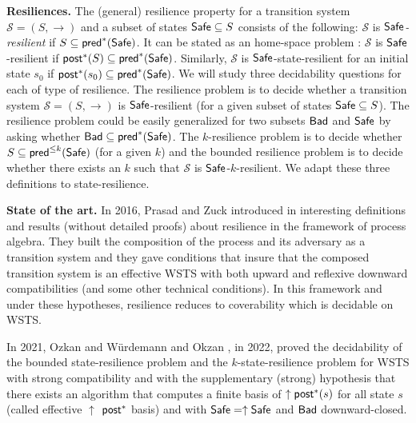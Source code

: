 {\bf Resiliences.}  
The (general) resilience property for a transition system $\mathscr{S} = (S,\rightarrow )$ and a subset of states $\textsf{Safe} \subseteq S$ consists of the following: $\mathscr{S}$ is {\em $\textsf{Safe}$-resilient} if
$S \subseteq \textsf{pred}^*(\textsf{Safe})$. %
It 
can be stated as an home-space problem : $\mathscr{S}$ is $\textsf{Safe}$-resilient if $\textsf{post}^*(S) \subseteq \textsf{pred}^*(\textsf{Safe})$.
Similarly, $\mathscr{S}$ is $\textsf{Safe}$-state-resilient for an initial state $s_0$ if  
$\textsf{post}^*(s_0) \subseteq \textsf{pred}^*(\textsf{Safe})$.
We will study three decidability questions for each of type of resilience.
The resilience problem is to decide whether a transition system $\mathscr{S} = (S,\rightarrow )$ is $\textsf{Safe}$-resilient (for a given subset of states $\textsf{Safe} \subseteq S$).
The resilience problem could be easily generalized for two subsets $\textsf{Bad}$ and $\textsf{Safe}$ by asking
whether $\textsf{Bad} \subseteq \textsf{pred}^*(\textsf{Safe})$.
The $k$-resilience problem is to decide whether $S \subseteq \textsf{pred}^{\leq k}(\textsf{Safe})$ (for a given $k$) and 
the bounded resilience problem is to decide whether there exists an $k$ such that $\mathscr{S}$ is $\textsf{Safe}$-$k$-resilient. We adapt these three definitions to state-resilience.


{\bf State of the art.}
In 2016, Prasad and Zuck introduced in  \cite{DBLP:journals/corr/PrasadZ16} interesting definitions and results (without detailed proofs) about resilience in the framework of process algebra. They built the composition of the process and its adversary as a transition system and they gave conditions that insure that the composed transition system is an effective WSTS with both upward and reflexive downward compatibilities (and some other technical conditions). In this framework and under these hypotheses, resilience reduces to coverability which is decidable on WSTS. 

In 2021, Ozkan and Würdemann  \cite{DBLP:journals/corr/abs-2108-00889} and Okzan \cite{DBLP:conf/gg/Ozkan22}, in 2022, proved the decidability of the bounded state-resilience problem and the $k$-state-resilience problem for WSTS  with strong compatibility and with the supplementary (strong) hypothesis that there exists an algorithm that computes a finite basis of $\uparrow \textsf{post}^*(s)$ for all state $s$ (called effective 
$\uparrow$ $\textsf{post}^*$ basis) and with $\textsf{Safe}=\uparrow \textsf{Safe}$ and $\textsf{Bad}$ downward-closed.

